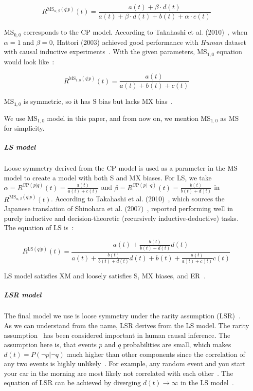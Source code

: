 \begin{equation}
R^{\text{MS}_{\alpha,\beta}(q|p)}(t) = \frac{a(t) + \beta\cdot d(t)}{a(t)+ \beta\cdot d(t) + b(t) + \alpha\cdot c(t)}
\end{equation}
\vspace{10pt}

MS$_{0,0}$ corresponds to the CP model. According to Takahashi et al. (2010)~\cite{cogn}, when $\alpha = 1$ and $\beta = 0$, Hattori (2003) achieved good performance with \textit{Human} dataset with causal inductive experiments~\cite{cogn,hattori03}. With the given parameters, MS$_{1,0}$ equation would look like~\cite{cogn}:
\vspace{10pt}

\begin{equation}
R^{\text{MS}_{1,0}(q|p)}(t) = \frac{a(t)}{a(t) + b(t) + c(t)}
\end{equation}
\vspace{10pt}

MS$_{1,0}$ is symmetric, so it has S bias but lacks MX bias~\cite{cogn}.

We use MS$_{1,0}$ model in this paper, and from now on, we mention MS$_{1,0}$ as MS for simplicity.

\subparagraph{LS model}

Loose symmetry derived from the CP model is used as a parameter in the MS model to create a model with both S and MX biases. For LS, we take $\alpha = R^{\text{CP}(p|q)}(t) = \frac{a(t)}{a(t)+c(t)}$ and $\beta = R^{\text{CP}(p|\neg q)}(t) = \frac{b(t)}{b(t)+d(t)}$ in $R^{\text{MS}_{\alpha,\beta}(q|p)}(t)$. According to Takahashi et al. (2010)~\cite{cogn}, which sources the Japanese translation of Shinohara et al. (2007)~\cite{shinohara}, reported performing well in purely inductive and decision-theoretic (recursively inductive-deductive) tasks. The equation of LS is~\cite{cogn,lrimp}:
\vspace{10pt}

\begin{equation}
R^{\text{LS}(q|p)}(t) = \frac{a(t) + \frac{b(t)}{b(t)+d(t)} d(t)}{a(t)+ \frac{b(t)}{b(t)+d(t)} d(t) + b(t) + \frac{a(t)}{a(t)+c(t)} c(t)}
\end{equation}
\vspace{10pt}

LS model satisfies XM and loosely satisfies S, MX biases, and ER~\cite{cogn}.


\subparagraph{LSR model}

The final model we use is loose symmetry under the rarity assumption (LSR)~\cite{cogn}. As we can understand from the name, LSR derives from the LS model. The rarity assumption~\cite{oaksford} has been considered important in human causal inference. The assumption here is, that events $p$ and $q$ probabilities are small, which makes $d(t) = P(\neg p| \neg q)$ much higher than other components since the correlation of any two events is highly unlikely~\cite{hattori07}. For example, any random event and you start your car in the morning are most likely not correlated with each other~\cite{hattori07}. The equation of LSR can be achieved by diverging $d(t) \rightarrow \infty$ in the LS model~\cite{cogn}.
\vspace{10pt}

